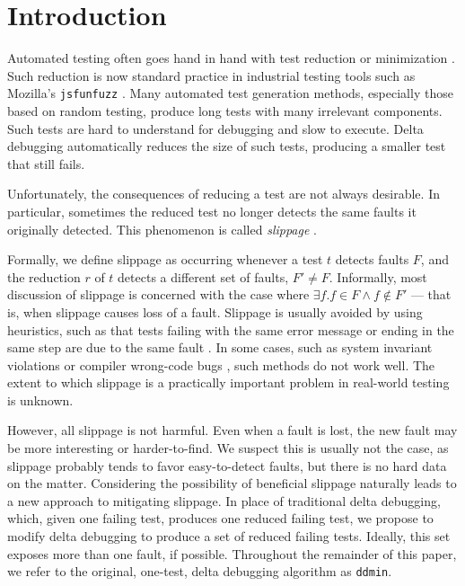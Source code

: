\section{Introduction}

Automated testing often goes hand in hand with
test reduction or minimization \cite{DD,MinUnit,TCminim,ICSEDiff,CReduce}.
Such reduction is
now standard practice in industrial testing tools such as Mozilla's
{\tt jsfunfuzz} \cite{jsfunfuzz}.  Many automated
test generation methods, especially those based on random testing,
produce long tests with many irrelevant components.  Such tests are
hard to understand for debugging and slow to execute.  Delta debugging
automatically reduces the size of such tests,
producing a smaller test that still fails.

Unfortunately, the consequences of reducing a test are not always
desirable.  In particular, sometimes the reduced test no longer
detects the same faults it originally detected.  This phenomenon is
called \emph{slippage} \cite{PLDI13}.  

Formally, we define slippage as occurring whenever a test $t$ detects
faults $F$, and the reduction $r$ of $t$ detects a different set of
faults, $F' \neq F$.  Informally, most discussion of slippage is
concerned with the case where
$\exists f .  f \in F \wedge f \not\in F'$ --- that is, when slippage
causes loss of a fault.  Slippage is usually avoided by using
heuristics, such as that tests failing with the same error message or
ending in the same step are due to the same fault \cite{ICSEDiff}.  In
some cases, such as system invariant violations or compiler wrong-code
bugs \cite{PLDI13}, such methods do not work well.  The extent to
which slippage is a practically important problem in real-world
testing is unknown.

However, all slippage is not
harmful.  Even when a fault is lost, the new fault may be more
interesting or harder-to-find.  We suspect this is usually not the
case, as slippage probably tends to favor easy-to-detect faults, but
there is no hard data on the matter.  Considering the
possibility of beneficial slippage naturally leads to a new approach to
mitigating slippage.  In place of traditional delta debugging, which,
given one failing test, produces one reduced failing test, we propose
to modify delta debugging to produce a set of reduced
failing tests.  Ideally, this set exposes more than one fault, if possible.
Throughout the remainder of this paper, we refer to the original,
one-test, delta debugging algorithm \cite{DD} as {\tt ddmin}.  

